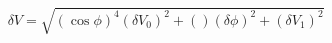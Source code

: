 \begin{equation}
\label{eq:delta_V_Malus}
\delta V = \sqrt{ \left(\cos{\phi}\right)^4(\delta V_0)^2 + \left(\right)(\delta \phi)^2+ (\delta V_1)^2}
\end{equation}